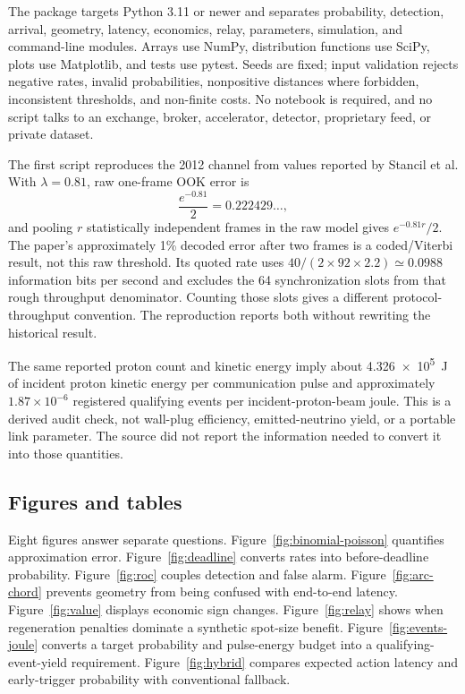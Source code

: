 \documentclass[11pt]{article}
\begin{document}
The package targets Python 3.11 or newer and separates probability, detection, arrival, geometry, latency, economics, relay, parameters, simulation, and command-line modules. Arrays use NumPy, distribution functions use SciPy, plots use Matplotlib, and tests use pytest. Seeds are fixed; input validation rejects negative rates, invalid probabilities, nonpositive distances where forbidden, inconsistent thresholds, and non-finite costs. No notebook is required, and no script talks to an exchange, broker, accelerator, detector, proprietary feed, or private dataset.

The first script reproduces the 2012 channel from values reported by Stancil et al. With $\lambda=0.81$, raw one-frame OOK error is
\begin{equation}
\frac{e^{-0.81}}{2}=0.222429\ldots,
\end{equation}
and pooling $r$ statistically independent frames in the raw model gives $e^{-0.81r}/2$. The paper's approximately 1\% decoded error after two frames is a coded/Viterbi result, not this raw threshold. Its quoted rate uses $40/(2\times92\times2.2)\simeq0.0988$ information bits per second and excludes the 64 synchronization slots from that rough throughput denominator. Counting those slots gives a different protocol-throughput convention. The reproduction reports both without rewriting the historical result.

The same reported proton count and kinetic energy imply about \SI{4.326e5}{\joule} of incident proton kinetic energy per communication pulse and approximately $1.87\times10^{-6}$ registered qualifying events per incident-proton-beam joule. This is a derived audit check, not wall-plug efficiency, emitted-neutrino yield, or a portable link parameter. The source did not report the information needed to convert it into those quantities.

\subsection{Figures and tables}

Eight figures answer separate questions. Figure~\ref{fig:binomial-poisson} quantifies approximation error. Figure~\ref{fig:deadline} converts rates into before-deadline probability. Figure~\ref{fig:roc} couples detection and false alarm. Figure~\ref{fig:arc-chord} prevents geometry from being confused with end-to-end latency. Figure~\ref{fig:value} displays economic sign changes. Figure~\ref{fig:relay} shows when regeneration penalties dominate a synthetic spot-size benefit. Figure~\ref{fig:events-joule} converts a target probability and pulse-energy budget into a qualifying-event-yield requirement. Figure~\ref{fig:hybrid} compares expected action latency and early-trigger probability with conventional fallback.
\end{document}
